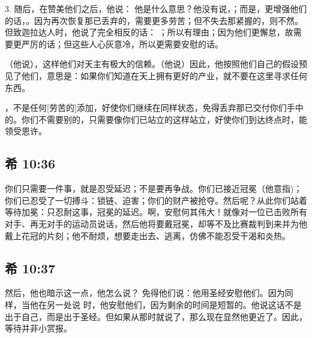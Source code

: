 3. 随后，在赞美他们之后，他说：  他是什么意思？他没有说，；而是，更增强他们的话，。因为再次恢复那已丢弃的，需要更多劳苦；但不失去那紧握的，则不然。但致迦拉达人时，他说了完全相反的话： ；所以有理由；因为他们更懈怠，故需要更严厉的话；但这些人心灰意冷，所以更需要安慰的话。\par

（他说），这样他们对天主有极大的信赖。（他说）因此，他按照他们自己的假设预见了他们，意思是：如果你们知道在天上拥有更好的产业，就不要在这里寻求任何东西。\par

，不是任何[劳苦的]添加，好使你们继续在同样状态，免得丢弃那已交付你们手中的。你们不需要别的，只需要像你们已站立的这样站立，好使你们到达终点时，能领受恩许。\par


\subsection{希 10:36}

  你们只需要一件事，就是忍受延迟；不是要再争战。你们已接近冠冕（他意指)；你们已忍受了一切搏斗：锁链、迫害；你们的财产被抢夺。然后呢？从此你们站着等待加冕：只忍耐这事，冠冕的延迟。啊，安慰何其伟大！就像对一位已击败所有对手、再无对手的运动员说话，然后他将要戴冠冕，却等不及比赛裁判到来并为他戴上花冠的片刻；他不耐烦，想要走出去、逃离，仿佛不能忍受干渴和炎热。\par


\subsection{希 10:37}

然后，他也暗示这一点，他怎么说？  免得他们说：他用圣经安慰他们。因为同样，当他在另一处说   时，他安慰他们，因为剩余的时间是短暂的。他说这话不是出于自己，而是出于圣经。但如果从那时就说了，那么现在显然他更近了。因此，等待并非小赏报。\par

